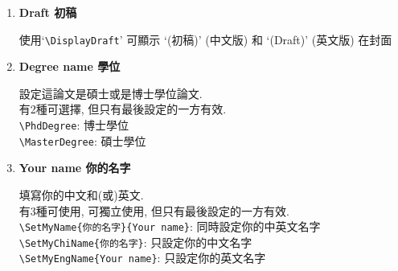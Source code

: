 \begin{enumerate}
{    有3種可使用, 可獨立使用, 但只有最後設定的一方有效\\
    \verb|\SetTitle{你的題目}{Your Title}|: 同時設定中英文題目\\
    \verb|\SetChiTitle{你的題目}|: 只設定中文題目\\
    \verb|\SetEngTitle{Your Title}|: 只設定英文題目\\

    如:\\
    \verb|\SetTitle %|\\
    \verb|{中文題目中文題目} %|\\
    \verb|{Your Title Your Title}|\\
    \verb|'%'|是必須的, 是用來跟LaTex說這3行是同一句話.

    或\\
    \verb|\SetChiTitle{中文題目中文題目}|\\
    \verb|\SetEngTitle{Your Title \\ Your Title}|

    圖書館說不管你是編寫中英混合或全英文版, 都\textbf{必須}同時存在中英題目.
  } %

  \item
  {
    \textbf{Draft 初稿}

    使用`\verb|\DisplayDraft|' 可顯示 `(初稿)' (中文版) 和 `(Draft)' (英文版) 在封面
  } %

  \item
  {
    \textbf{Degree name 學位}

    設定這論文是碩士或是博士學位論文.\\
    有2種可選擇, 但只有最後設定的一方有效.\\
    \verb|\PhdDegree|: 博士學位\\
    \verb|\MasterDegree|: 碩士學位
  } %

  \item
  {
    \textbf{Your name 你的名字}

    填寫你的中文和(或)英文.\\
    有3種可使用, 可獨立使用, 但只有最後設定的一方有效.\\
    \verb|\SetMyName{你的名字}{Your name}|: 同時設定你的中英文名字\\
    \verb|\SetMyChiName{你的名字}|: 只設定你的中文名字\\
    \verb|\SetMyEngName{Your name}|: 只設定你的英文名字
  } %


\end{enumerate}
